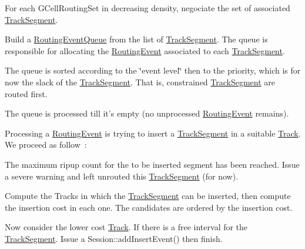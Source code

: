 For each {\ttfamily G\-Cell\-Routing\-Set} in decreasing density, negociate the set of associated {\ttfamily \hyperlink{classKite_1_1TrackSegment}{Track\-Segment}}. 
\begin{DoxyEnumerate}
\item Build a {\ttfamily \hyperlink{classKite_1_1RoutingEventQueue}{Routing\-Event\-Queue}} from the list of {\ttfamily \hyperlink{classKite_1_1TrackSegment}{Track\-Segment}}. The queue is responsible for allocating the {\ttfamily \hyperlink{classKite_1_1RoutingEvent}{Routing\-Event}} associated to each {\ttfamily \hyperlink{classKite_1_1TrackSegment}{Track\-Segment}}. 
\item The queue is sorted according to the \char`\"{}event level\char`\"{} then to the priority, which is for now the slack of the {\ttfamily \hyperlink{classKite_1_1TrackSegment}{Track\-Segment}}. That is, constrained {\ttfamily \hyperlink{classKite_1_1TrackSegment}{Track\-Segment}} are routed first. 
\item The queue is processed till it's empty (no unprocessed {\ttfamily \hyperlink{classKite_1_1RoutingEvent}{Routing\-Event}} remains).

Processing a {\ttfamily \hyperlink{classKite_1_1RoutingEvent}{Routing\-Event}} is trying to insert a {\ttfamily \hyperlink{classKite_1_1TrackSegment}{Track\-Segment}} in a suitable \hyperlink{classKite_1_1Track}{Track}. We proceed as follow~\-: 
\begin{DoxyItemize}
\item The maximum ripup count for the to be inserted segment has been reached. Issue a severe warning and left unrouted this {\ttfamily \hyperlink{classKite_1_1TrackSegment}{Track\-Segment}} (for now). 
\item Compute the Tracks in which the {\ttfamily \hyperlink{classKite_1_1TrackSegment}{Track\-Segment}} can be inserted, then compute the insertion cost in each one. The candidates are ordered by the insertion cost. 
\item Now consider the lower cost {\ttfamily \hyperlink{classKite_1_1Track}{Track}}. If there is a free interval for the {\ttfamily \hyperlink{classKite_1_1TrackSegment}{Track\-Segment}}. Issue a {\ttfamily Session\-::add\-Insert\-Event()} then finish.


\end{DoxyItemize}
\end{DoxyEnumerate}
